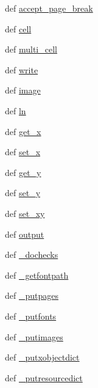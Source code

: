 \begin{DoxyCompactItemize}
\item 
def \hyperlink{namespacemmasgis_1_1fpdf_ae16d4f5ae72cf144d3e349873cbcf5ab}{accept\_\-page\_\-break}
\item 
def \hyperlink{namespacemmasgis_1_1fpdf_a4d80eac3dca0439151266cedc7690626}{cell}
\item 
def \hyperlink{namespacemmasgis_1_1fpdf_a28e47962aed5186a1c7e262f59f24cd4}{multi\_\-cell}
\item 
def \hyperlink{namespacemmasgis_1_1fpdf_a84d0829564edc94d344ec5977c935480}{write}
\item 
def \hyperlink{namespacemmasgis_1_1fpdf_a1bc7d88ed906d95cc5f0426e23f78477}{image}
\item 
def \hyperlink{namespacemmasgis_1_1fpdf_ae67deeb7ec3a6f9db18e00bfdc59816e}{ln}
\item 
def \hyperlink{namespacemmasgis_1_1fpdf_a2e3e0cd19161f42f35089d3f8e25e913}{get\_\-x}
\item 
def \hyperlink{namespacemmasgis_1_1fpdf_afe860f241fb4bfe614195534457d2071}{set\_\-x}
\item 
def \hyperlink{namespacemmasgis_1_1fpdf_a52c89ef96524ea05a35d7f42666f9e59}{get\_\-y}
\item 
def \hyperlink{namespacemmasgis_1_1fpdf_ab174794eb23e6f458011dbf687bd913e}{set\_\-y}
\item 
def \hyperlink{namespacemmasgis_1_1fpdf_af8651373355944527fc4054e5e72f749}{set\_\-xy}
\item 
def \hyperlink{namespacemmasgis_1_1fpdf_a37f94d4b1c351fae5e6ff598ec448bcc}{output}
\item 
def \hyperlink{namespacemmasgis_1_1fpdf_a1305de978f89db7f3bfa10dd95c3b142}{\_\-dochecks}
\item 
def \hyperlink{namespacemmasgis_1_1fpdf_acb2770ecf55e65060d13b7e9fe6e5b6e}{\_\-getfontpath}
\item 
def \hyperlink{namespacemmasgis_1_1fpdf_a2e61a84a6de3fa7eaae6f98186884dcb}{\_\-putpages}
\item 
def \hyperlink{namespacemmasgis_1_1fpdf_a61fee9b385ca1201d391d3937f68de19}{\_\-putfonts}
\item 
def \hyperlink{namespacemmasgis_1_1fpdf_ac23115276c31a31b3b276840e1b47d8b}{\_\-putimages}
\item 
def \hyperlink{namespacemmasgis_1_1fpdf_a7052e460a1fc76c19a84c7bf3cf2741a}{\_\-putxobjectdict}
\item 
def \hyperlink{namespacemmasgis_1_1fpdf_a671d353697bf6207a2dc89c830c0707d}{\_\-putresourcedict}
\item 

\end{DoxyCompactItemize}
